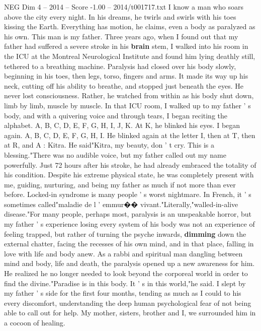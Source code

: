 \begin{textsample}{NEG Dim 4 – 2014 – Score -1.00 – 2014/t001717.txt}  \label{ex:f4_neg_015}
I know a man who soars above the city every night.
In his dreams, he twirls and swirls with his toes kissing the Earth.
Everything has motion, he claims, even a body as paralyzed as his own.
This man is my father.
Three years ago, when I found out that my father had suffered a severe stroke in his \textbf{brain} stem, I walked into his room in the ICU at the Montreal Neurological Institute and found him lying deathly still, tethered to a breathing machine.
Paralysis had closed over his body slowly, beginning in his toes, then legs, torso, fingers and arms.
It made its way up his neck, cutting off his ability to breathe, and stopped just beneath the eyes.
He never lost consciousness.
Rather, he watched from within as his body shut down, limb by limb, muscle by muscle.
In that ICU room, I walked up to my father ' s body, and with a quivering voice and through tears, I began reciting the alphabet.
A, B, C, D, E, F, G, H, I, J, K.
At K, he blinked his eyes.
I began again.
A, B, C, D, E, F, G, H, I.
He blinked again at the letter I, then at T, then at R, and A : Kitra.
He said"Kitra, my beauty, don ' t cry.
This is a blessing."There was no audible voice, but my father called out my name powerfully.
Just 72 hours after his stroke, he had already embraced the totality of his condition.
Despite his extreme physical state, he was completely present with me, guiding, nurturing, and being my father as much if not more than ever before.
Locked-in syndrome is many people ' s worst nightmare.
In French, it ' s sometimes called"maladie de l ' emmur{\EmojiFont �}{\EmojiFont �} vivant."Literally,"walled-in-alive disease."For many people, perhaps most, paralysis is an unspeakable horror, but my father ' s experience losing every system of his body was not an experience of feeling trapped, but rather of turning the psyche inwards, \textbf{dimming} down the external chatter, facing the recesses of his own mind, and in that place, falling in love with life and body anew.
As a rabbi and spiritual man dangling between mind and body, life and death, the paralysis opened up a new awareness for him.
He realized he no longer needed to look beyond the corporeal world in order to find the divine."Paradise is in this body.
It ' s in this world,"he said.
I slept by my father ' s side for the first four months, tending as much as I could to his every discomfort, understanding the deep human psychological fear of not being able to call out for help.
My mother, sisters, brother and I, we surrounded him in a cocoon of healing.

\end{textsample}
